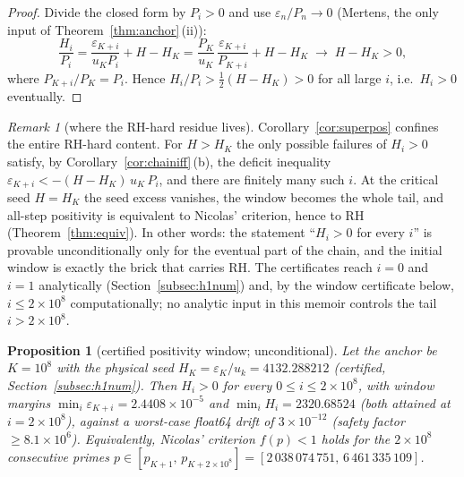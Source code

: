 \documentclass[11pt]{article}
\newtheorem{proposition}[theorem]{Proposition}
\theoremstyle{remark}
\newtheorem{remark}[theorem]{Remark}
\newcommand{\uk}{u_k}
\newcommand{\eps}{\varepsilon}
\begin{document}
\begin{proof}
Divide the closed form by $P_i>0$ and use $\eps_n/P_n\to0$ (Mertens, the only
input of Theorem~\ref{thm:anchor}\,(ii)):
\[
\frac{H_i}{P_i}
=\frac{\eps_{K+i}}{u_KP_i}+H-H_K
=\frac{P_K}{u_K}\,\frac{\eps_{K+i}}{P_{K+i}}+H-H_K
\;\longrightarrow\;H-H_K>0 ,
\]
where $P_{K+i}/P_K=P_i$. Hence $H_i/P_i>\tfrac12(H-H_K)>0$ for all large $i$,
i.e.\ $H_i>0$ eventually.
\end{proof}

\begin{remark}[where the RH-hard residue lives]\label{rem:supercritical}
Corollary~\ref{cor:superpos} confines the entire RH-hard content. For
$H>H_K$ the only possible failures of $H_i>0$ satisfy, by
Corollary~\ref{cor:chainiff}\,(b), the deficit inequality
$\eps_{K+i}<-(H-H_K)\,u_K\,P_i$, and there are finitely many such $i$.
At the critical seed $H=H_K$ the seed excess vanishes, the window becomes
the whole tail, and all-step positivity is equivalent to Nicolas'
criterion, hence to RH (Theorem~\ref{thm:equiv}). In other words: the
statement ``$H_i>0$ for every $i$'' is provable unconditionally only for
the eventual part of the chain, and the initial window is exactly the
brick that carries RH. The certificates reach $i=0$ and $i=1$ analytically
(Section~\ref{subsec:h1num}) and, by the window certificate below,
$i\le 2\times10^8$ computationally; no analytic input in this memoir
controls the tail $i>2\times10^8$.
\end{remark}

\begin{proposition}[certified positivity window; unconditional]
\label{prop:hiposwin}
Let the anchor be $K=10^8$ with the physical seed $H_K=\eps_K/\uk
=4132.288212$ (certified, Section~\ref{subsec:h1num}). Then $H_i>0$ for
every $0\le i\le 2\times10^8$, with window margins
$\min_i\eps_{K+i}=2.4408\times10^{-5}$ and $\min_i H_i=2320.68524$ (both
attained at $i=2\times10^8$), against a worst-case float64 drift of
$3\times10^{-12}$ (safety factor $\ge8.1\times10^6$). Equivalently,
Nicolas' criterion $f(p)<1$ holds for the $2\times10^8$ consecutive
primes $p\in[p_{K+1},\,p_{K+2\times10^8}]
=[2\,038\,074\,751,\,6\,461\,335\,109]$.
\end{proposition}
\end{document}
